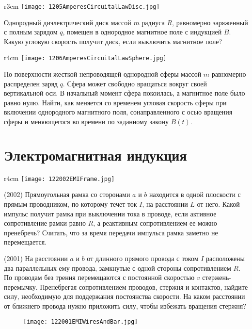 \begin{wrapfigure}{r}{3cm}
\texttt{[image: 1205AmperesCircuitalLawDisc.jpg]}
\end{wrapfigure}

\AddProb Однородный диэлектрический диск массой $m$ радиуса $R$, равномерно заряженный с полным зарядом $q$, 
помещен в однородное магнитное поле с индукцией $B$. Какую угловую скорость получит диск, если выключить магнитное поле?

\begin{wrapfigure}{r}{4cm}
\texttt{[image: 1206AmperesCircuitalLawSphere.jpg]}
\end{wrapfigure}

\AddProb По поверхности жесткой непроводящей однородной сферы массой $m$ равномерно распределен заряд $q$. 
Сфера может свободно вращаться вокруг своей вертикальной оси. В начальный момент сфера покоилась, а магнитное поле было равно нулю. 
Найти, как меняется со временем угловая скорость сферы при включении однородного магнитного поля, 
сонаправленного с осью вращения сферы и меняющегося во времени по заданному закону $B(t)$.


\section{Электромагнитная индукция}

\begin{wrapfigure}{r}{4cm}
\texttt{[image: 122002EMIFrame.jpg]}
\end{wrapfigure}

\AddProb (2002) Прямоугольная рамка со сторонами $a$ и $b$ находится в одной плоскости с прямым проводником, 
по которому течет ток $I$, на расстоянии $L$ от него. Какой импульс получит рамка при выключении тока в проводе, 
если активное сопротивление рамки равно $R$, а реактивным сопротивлением ее можно пренебречь? 
Считать, что за время передачи импульса рамка заметно не перемещается.

\AddProb (2001) На расстоянии $a$ и $b$ от длинного прямого провода с током $I$ расположены два параллельных ему провода, 
замкнутые с одной стороны сопротивлением $R$. По проводам без трения перемещаются с постоянной скоростью $v$ стержень-перемычку. 
Пренебрегая сопротивлением проводов, стержня и контактов, найдите силу, необходимую для поддержания постоянства скорости. 
На каком расстоянии от ближнего провода нужно приложить силу, чтобы избежать вращения стержня?

\begin{figure}[!h]
\texttt{[image: 122001EMIWiresAndBar.jpg]}
\end{figure}

